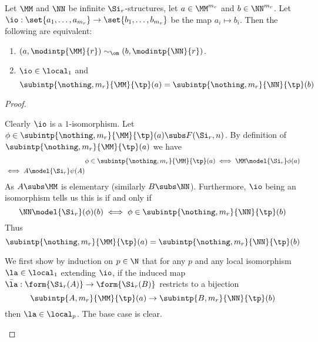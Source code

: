 \begin{prop}
    Let $\MM$ and $\NN$ be infinite $\Si_r$-structures,
    let $a \in \MM^{m_r}$ and $b \in \NN^{m_r}$.
    Let $\io : \set{a_1,\dots,a_{m_r}} \to \set{b_1,\dots,b_{m_r}}$
    be the map $a_i \mapsto b_i$.
    Then the following are equivalent:
    \begin{enumerate}
        \item $(a,\modintp{\MM}{r}) \sim_\om (b, \modintp{\NN}{r})$.
        \item $\io \in \local_1$ and 
            \[\subintp{\nothing,m_r}{\MM}{\tp}(a) = 
            \subintp{\nothing,m_r}{\NN}{\tp}(b)\]
    \end{enumerate}
\end{prop}
\begin{proof}
    \begin{forward}
        Clearly $\io$ is a $1$-isomorphism.
        Let $\phi \in \subintp{\nothing,m_r}{\MM}{\tp}(a) \subs F(\Si_r,n)$.
        By definition of $\subintp{\nothing,m_r}{\MM}{\tp}(a)$ we have 
        \begin{align*}
            &\phi \in \subintp{\nothing,m_r}{\MM}{\tp}(a) \iff 
            \MM \model{\Si_r} \phi(a) \\
            \iff A \model{\Si_r} \psi(A)
        \end{align*}
        As $A \subs \MM$ is elementary (similarly $B \subs \NN$).
        Furthermore, $\io$ being an isomorphism tells us this is if and only if
        \[
            \NN \model{\Si_r} (\phi)(b)
            \iff \phi \in \subintp{\nothing,m_r}{\NN}{\tp}(b)
        \]
        Thus 
        \[
            \subintp{\nothing,m_r}{\MM}{\tp}(a) = 
            \subintp{\nothing,m_r}{\NN}{\tp}(b)
        \]
    \end{forward}

    \begin{backward}
        We first show by induction on $p \in \N$
        that for any $p$ and any local isomorphism $\la \in \local_1$ 
        extending $\io$, if the induced map 
        $\bar{\la} : \form{\Si_r(A)} \to \form{\Si_r(B)}$
        restricts to a bijection
        \[\subintp{A,m_r}{\MM}{\tp}(a) \to 
        \subintp{B,m_r}{\NN}{\tp}(b)\]
        then $\la \in \local_p$.
        The base case is clear.


\end{backward}
\end{proof}

